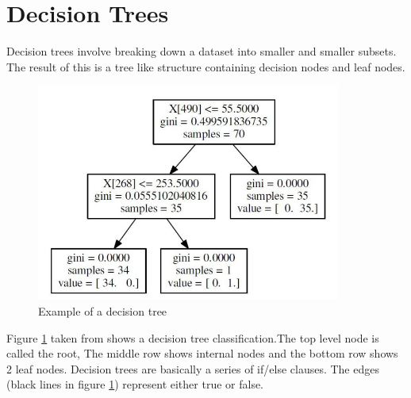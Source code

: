 \section{Decision Trees}

Decision trees involve breaking down a dataset into smaller and smaller subsets. The result of this is a tree like structure containing decision nodes and leaf nodes.

\begin{figure}[H]
  \centering
  \includegraphics[scale=0.5,width=100mm]{./images/decision-tree-example.jpg}
  \caption{Example of a decision tree}
  \label{fig:abalone-decision-tree}
\end{figure}

Figure \ref{fig:abalone-decision-tree} taken from \cite{decisionTreeExample} shows a decision tree classification.The top level node is called the root, The middle row shows internal nodes and the bottom row shows 2 leaf nodes. Decision trees are basically a series of if/else clauses. The edges (black lines in figure \ref{fig:abalone-decision-tree}) represent either true or false.